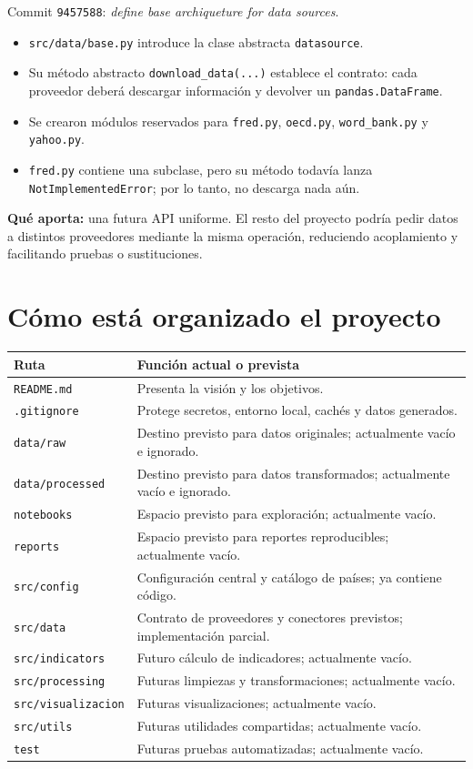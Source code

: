 \documentclass[11pt,a4paper]{article}
\newcommand{\code}[1]{\texttt{#1}}
\begin{document}
Commit \code{9457588}: \emph{define base archiqueture for data sources}.

\begin{itemize}
  \item \code{src/data/base.py} introduce la clase abstracta \code{datasource}.
  \item Su método abstracto \code{download\_data(...)} establece el contrato: cada proveedor deberá descargar información y devolver un \code{pandas.DataFrame}.
  \item Se crearon módulos reservados para \code{fred.py}, \code{oecd.py}, \code{word\_bank.py} y \code{yahoo.py}.
  \item \code{fred.py} contiene una subclase, pero su método todavía lanza \code{NotImplementedError}; por lo tanto, no descarga nada aún.
\end{itemize}

\textbf{Qué aporta:} una futura API uniforme. El resto del proyecto podría pedir datos a distintos proveedores mediante la misma operación, reduciendo acoplamiento y facilitando pruebas o sustituciones.

\section{Cómo está organizado el proyecto}

\begin{tabularx}{\textwidth}{@{}p{4.0cm}X@{}}
\toprule
\textbf{Ruta} & \textbf{Función actual o prevista} \\
\midrule
\code{README.md} & Presenta la visión y los objetivos. \\
\code{.gitignore} & Protege secretos, entorno local, cachés y datos generados. \\
\code{data/raw} & Destino previsto para datos originales; actualmente vacío e ignorado. \\
\code{data/processed} & Destino previsto para datos transformados; actualmente vacío e ignorado. \\
\code{notebooks} & Espacio previsto para exploración; actualmente vacío. \\
\code{reports} & Espacio previsto para reportes reproducibles; actualmente vacío. \\
\code{src/config} & Configuración central y catálogo de países; ya contiene código. \\
\code{src/data} & Contrato de proveedores y conectores previstos; implementación parcial. \\
\code{src/indicators} & Futuro cálculo de indicadores; actualmente vacío. \\
\code{src/processing} & Futuras limpiezas y transformaciones; actualmente vacío. \\
\code{src/visualizacion} & Futuras visualizaciones; actualmente vacío. \\
\code{src/utils} & Futuras utilidades compartidas; actualmente vacío. \\
\code{test} & Futuras pruebas automatizadas; actualmente vacío. \\
\bottomrule
\end{tabularx}
\end{document}
